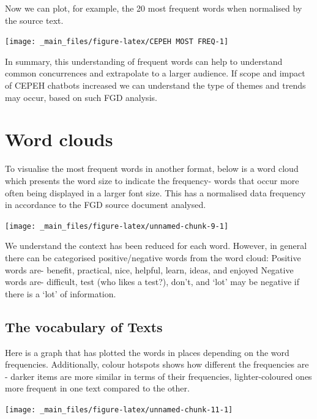 \documentclass[a4paper, nobind]{templates/ociamthesis}
\begin{document}
Now we can plot, for example, the 20 most frequent words when normalised
by the source text.

\begin{center}\texttt{[image: \_main\_files/figure-latex/CEPEH MOST FREQ-1]} \end{center}

In summary, this understanding of frequent words can help to understand
common concurrences and extrapolate to a larger audience. If scope and
impact of CEPEH chatbots increased we can understand the type of themes
and trends may occur, based on such FGD analysis.

\hypertarget{word-clouds}{%
\section{Word clouds}\label{word-clouds}}

To visualise the most frequent words in another format, below is a word
cloud which presents the word size to indicate the frequency- words that
occur more often being displayed in a larger font size. This has a
normalised data frequency in accordance to the FGD source document
analysed.

\begin{center}\texttt{[image: \_main\_files/figure-latex/unnamed-chunk-9-1]} \end{center}

We understand the context has been reduced for each word. However, in
general there can be categorised positive/negative words from the word
cloud: Positive words are- benefit, practical, nice, helpful, learn,
ideas, and enjoyed Negative words are- difficult, test (who likes a
test?), don't, and `lot' may be negative if there is a `lot' of
information.

\hypertarget{the-vocabulary-of-texts}{%
\subsection{The vocabulary of Texts}\label{the-vocabulary-of-texts}}

Here is a graph that has plotted the words in places depending on the
word frequencies. Additionally, colour hotspots shows how different the
frequencies are - darker items are more similar in terms of their
frequencies, lighter-coloured ones more frequent in one text compared to
the other.

\begin{flushleft}\texttt{[image: \_main\_files/figure-latex/unnamed-chunk-11-1]} \end{flushleft}
\end{document}
